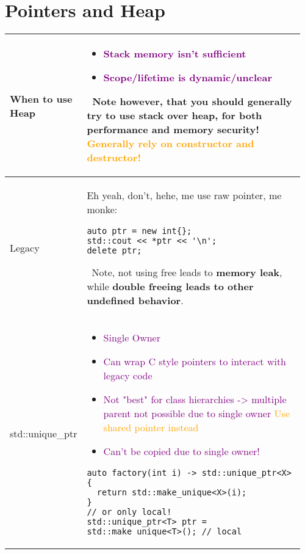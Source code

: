 \documentclass[main.tex,fontsize=8pt,paper=a4,paper=portrait,DIV=calc,]{scrartcl}
\begin{document}
\begin{table}[ht!]
\section{Pointers and Heap}
\begin{tabular}{|m{0.2\linewidth}|m{0.755\linewidth}|}
\hline
When to use Heap & 
\vspace{2mm}
\begin{itemize}
\item \textcolor{purple}{Stack memory isn't sufficient}
\item \textcolor{purple}{Scope/lifetime is dynamic/unclear}
\end{itemize} 
\, \newline
Note however, that you should generally try to use stack over heap, for both \textbf{performance and memory security!}\newline
\textcolor{orange}{Generally rely on constructor and destructor!}\\
\hline
Legacy & 
Eh yeah, don't, hehe, me use raw pointer, me monke:\newline
\begin{lstlisting}
auto ptr = new int{};
std::cout << *ptr << '\n';
delete ptr;
\end{lstlisting} 
\, \newline
Note, not using free leads to \textbf{memory leak}, while \textbf{double freeing leads to other undefined behavior}.\\
\hline
std::unique\_ptr & 
\vspace{2mm}
\begin{itemize}
\item \textcolor{purple}{Single Owner}
\item \textcolor{purple}{Can wrap C style pointers to interact with legacy code}
\item \textcolor{purple}{Not "best" for class hierarchies -> multiple parent not possible due to single owner}\newline
  \textcolor{orange}{Use shared pointer instead}
\item \textcolor{purple}{Can't be copied due to single owner!}
\vspace{-3mm}
\end{itemize} 
\begin{lstlisting}
auto factory(int i) -> std::unique_ptr<X> {
  return std::make_unique<X>(i);
}
// or only local!
std::unique_ptr<T> ptr = std::make_unique<T>(); // local
\end{lstlisting}

\end{tabular}
\end{table}
\end{document}
